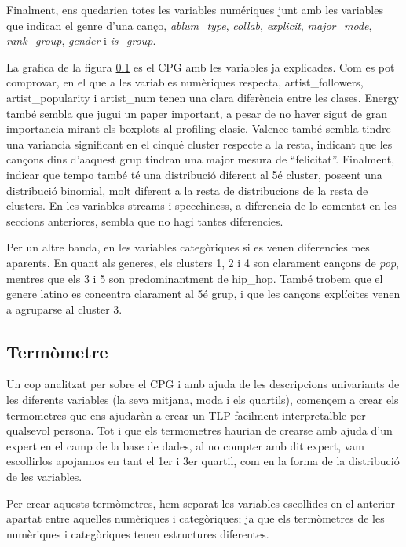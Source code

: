 \documentclass{article}
\begin{document}
Finalment, ens quedarien totes les variables numériques junt amb les variables que indican el genre d'una canço, \textit{ablum\_type}, \textit{collab}, \textit{explicit}, \textit{major\_mode}, \textit{rank\_group}, \textit{gender} i \textit{is\_group}. 

La grafica de la figura \ref{} es el CPG amb les variables ja explicades. Com es pot comprovar, en el que a les variables numèriques respecta, artist\_followers, artist\_popularity i artist\_num tenen una clara diferència entre les clases. Energy també sembla que jugui un paper important, a pesar de no haver sigut de gran importancia mirant els boxplots al profiling clasic.  Valence també sembla tindre una variancia significant en el cinqué cluster respecte a la resta, indicant que les cançons dins d'aaquest grup tindran una major mesura de ``felicitat''. Finalment, indicar que tempo també té una distribució diferent al 5é cluster, poseent una distribució binomial, molt diferent a la resta de distribucions de la resta de clusters. En les variables streams i speechiness, a diferencia de lo comentat en les seccions anteriores, sembla que no hagi tantes diferencies.

Per un altre banda, en les variables categòriques si es veuen diferencies mes aparents. En quant als generes, els clusters 1, 2 i 4 son clarament cançons de \textit{pop}, mentres que els 3 i 5 son predominantment de hip\_hop. També trobem que el genere latino es concentra clarament al 5é grup, i que les cançons explícites venen a agruparse al cluster 3.
 
\subsection{Termòmetre}

Un cop analitzat per sobre el CPG i amb ajuda de les descripcions univariants de les diferents variables (la seva mitjana, moda i els quartils), començem a crear els termometres que ens ajudaràn a crear un TLP facilment interpretalble per qualsevol persona. Tot i que els termometres haurian de crearse amb ajuda d'un expert en el camp de la base de dades, al no compter amb dit expert, vam escollirlos apojannos en tant el 1er i 3er quartil, com en la forma de la distribució de les variables.

Per crear aquests termòmetres, hem separat les variables escollides en el anterior apartat entre aquelles numèriques i categòriques; ja que els termòmetres de les numèriques i categòriques tenen estructures diferentes. 
\end{document}
